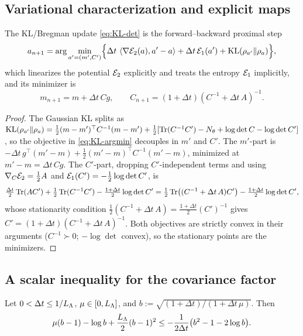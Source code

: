 \subsection{Variational characterization and explicit maps}
\label{app:KL-var}

\begin{lemma}
\label{lem:KL-argmin}
The KL/Bregman update \eqref{eq:KL-det} is the forward--backward proximal step
\begin{equation}
\label{eq:KL-argmin}
    a_{n+1}=\arg\min_{a'=(m',C')}\Bigl\{\Delta t\,\left\langle \nabla\mathcal{E}_2(a),a'-a\right\rangle+\Delta t\,\mathcal{E}_1(a')+\mathrm{KL}(\rho_{a'}\|\rho_a)\Bigr\},
\end{equation}
which linearizes the potential $\mathcal{E}_2$ explicitly and treats the entropy $\mathcal{E}_1$ implicitly, and
its minimizer is
\begin{equation}
\label{eq:KL-maps}
    m_{n+1}=m+\Delta t\,C g,
    \qquad
    C_{n+1}=(1+\Delta t)(C^{-1}+\Delta t\,A)^{-1}.
\end{equation}
\end{lemma}

\begin{proof}
The Gaussian KL splits as
$\mathrm{KL}(\rho_{a'}\|\rho_a)=\tfrac12(m-m')^\top C^{-1}(m-m')+\tfrac12[\operatorname{Tr}(C^{-1}C')-N_\theta+\log\det C-\log\det C']$,
so the objective in \eqref{eq:KL-argmin} decouples in $m'$ and $C'$. The $m'$-part is
$-\Delta t\,g^\top(m'-m)+\tfrac12(m'-m)^\top C^{-1}(m'-m)$, minimized at $m'-m=\Delta t\,Cg$. The
$C'$-part, dropping $C'$-independent terms and using $\nabla_C\mathcal{E}_2=\tfrac12A$ and
$\mathcal{E}_1(C')=-\tfrac12\log\det C'$, is
\[
    \tfrac{\Delta t}2\operatorname{Tr}(AC')+\tfrac12\operatorname{Tr}(C^{-1}C')-\tfrac{1+\Delta t}2\log\det C'
    =\tfrac12\operatorname{Tr}\bigl((C^{-1}+\Delta t\,A)C'\bigr)-\tfrac{1+\Delta t}2\log\det C',
\]
whose stationarity condition $\tfrac12(C^{-1}+\Delta t\,A)=\tfrac{1+\Delta t}2(C')^{-1}$ gives
$C'=(1+\Delta t)(C^{-1}+\Delta t\,A)^{-1}$. Both objectives are strictly convex in their arguments
($C^{-1}\succ0$; $-\log\det$ convex), so the stationary points are the minimizers.
\end{proof}

\subsection{A scalar inequality for the covariance factor}
\label{app:KL-scalar}

\begin{lemma}
\label{lem:scalar-KL}
Let $0<\Delta t\leq1/L_\Lambda$, $\mu\in[0,L_\Lambda]$, and $b:=\sqrt{(1+\Delta t)/(1+\Delta t\,\mu)}$. Then
\begin{equation}
\label{eq:scalar-KL}
    \mu(b-1)-\log b+\frac{L_\Lambda}2(b-1)^2\leq-\frac1{2\Delta t}\bigl(b^2-1-2\log b\bigr).
\end{equation}
\end{lemma}

